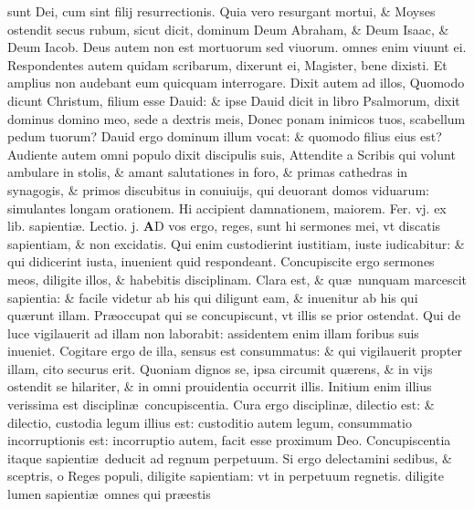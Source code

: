 \documentclass[a5paper,10pt]{book}
\def\leftmarginnote{%
	\lrmarginnote{\hskip -\marginparsep \hskip -6.5em}}
\def\ae{æ}
\begin{document}
\begin{multicols*}{2}
sunt Dei, cum sint filij resurrectionis.
Quia vero resurgant mortui, \& Moyses ostendit secus rubum, sicut dicit, dominum Deum Abraham, \& Deum Isaac, \& Deum Iacob.
Deus autem non est mortuorum sed viuorum. omnes enim viuunt ei. Respondentes autem quidam scribarum, dixerunt ei, Magister, bene dixisti. Et amplius non audebant eum quicquam interrogare.
Dixit autem ad illos, Quomodo dicunt Christum, filium esse Dauid: \& ipse Dauid dicit in libro Psalmorum, dixit dominus domino meo, sede a dextris meis, Donec ponam inimicos tuos, scabellum pedum tuorum?
Dauid ergo dominum illum vocat: \& quomodo filius eius est? Audiente autem omni populo dixit discipulis suis, Attendite a Scribis qui volunt ambulare in stolis, \& amant salutationes in foro, \& primas cathedras in synagogis, \& primos discubitus in conuiuijs, qui deuorant domos viduarum: simulantes longam orationem.
Hi accipient damnationem, maiorem.
\newline {} \color{red} \hypertarget{FRI-TERTIA-POST-ADV}{Fer. vj.} ex lib. sapienti\ae . Lectio. j. \color{black}
\vspace{-2.25em}
\lettrine[lines=2]{\bfseries A}{}D\leftmarginnote{\begin{flushright}ca. 6.\end{flushright}} vos ergo, reges, sunt hi sermones mei, vt discatis sapientiam, \& non excidatis.
Qui enim custodierint iustitiam, iuste iudicabitur: \& qui didicerint iusta, inuenient quid respondeant. Concupiscite ergo sermones meos, diligite illos, \& habebitis disciplinam.
Clara est, \& qu\ae \ nunquam marcescit sapientia: \& facile videtur ab his qui diligunt eam, \& inuenitur ab his qui qu\ae runt illam.
Pr\ae occupat qui se concupiscunt, vt illis se prior ostendat. Qui de luce vigilauerit ad illam non laborabit: assidentem enim illam foribus suis inueniet.
Cogitare ergo de illa, sensus est consummatus: \& qui vigilauerit propter illam, cito securus erit. Quoniam dignos se, ipsa circumit qu\ae rens, \& in vijs ostendit se hilariter, \& in omni prouidentia occurrit illis.
Initium enim illius verissima est disciplin\ae \ concupiscentia. Cura ergo disciplin\ae , dilectio est: \& dilectio, custodia legum illius est: custoditio autem legum, consummatio incorruptionis est: incorruptio autem, facit esse proximum Deo.
Concupiscentia itaque sapienti\ae \ deducit ad regnum perpetuum. Si ergo delectamini sedibus, \& sceptris, o Reges populi, diligite sapientiam: vt in perpetuum regnetis. diligite lumen sapienti\ae \ omnes qui pr\ae estis

\end{multicols*}
\end{document}
